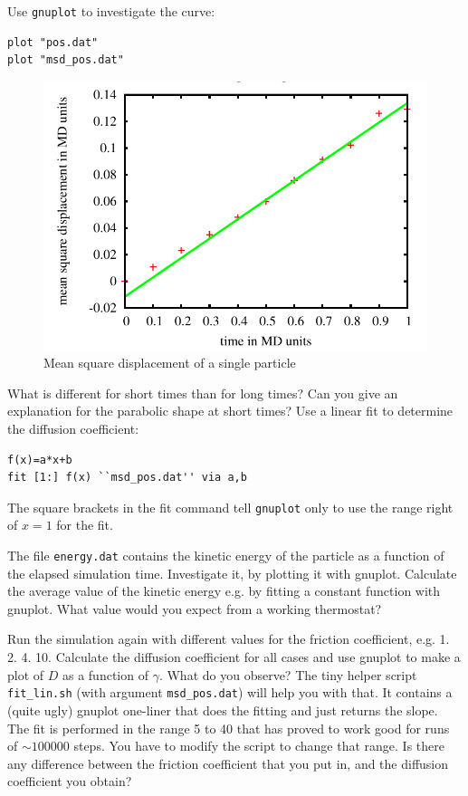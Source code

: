 Use  \lstinline|gnuplot|
to investigate the curve:
{\vspace{0,2cm}\small
\begin{lstlisting}[numbers=none]
plot "pos.dat"
plot "msd_pos.dat"
\end{lstlisting}\vspace{0,2cm}
}
\begin{figure}[h]
  \begin{center}
    \includegraphics{../figs/msd.pdf}
  \end{center}
  \caption{Mean square displacement of a single particle}
\end{figure}

What is different for short times than for long times?
Can you give an explanation for the parabolic shape at short
times?
Use a linear fit to determine the diffusion coefficient:
{\vspace{0,2cm}\small
\begin{lstlisting}[numbers=none]
f(x)=a*x+b
fit [1:] f(x) ``msd_pos.dat'' via a,b
\end{lstlisting}\vspace{0,2cm}
}
The square brackets in the fit command tell \lstinline{gnuplot}
only to use the range right of $x=1$ for the fit.

The file \lstinline|energy.dat| contains the kinetic energy of the
particle as a function of the elapsed simulation time. Investigate
it, by plotting it with gnuplot. Calculate the average value of 
the kinetic energy e.g. by fitting a constant function with gnuplot.
What value would you expect from a working thermostat?

Run the simulation again with different values for the friction
coefficient, e.g. 1. 2. 4. 10. Calculate the diffusion
coefficient for all cases and use gnuplot to make a plot of
$D$ as a function of $\gamma$. What do you observe?
The tiny helper script \lstinline|fit_lin.sh| 
(with argument \lstinline|msd_pos.dat|)
will help you with that. It contains
a (quite ugly) gnuplot one-liner that does the fitting and just
returns the slope. The fit is performed in the range 5 to 40 that
has proved to work good for runs of $\sim 100000$ steps. You have to 
modify the script to change that range.
Is there any difference between the
friction coefficient that you put in, and the diffusion coefficient
you obtain?

